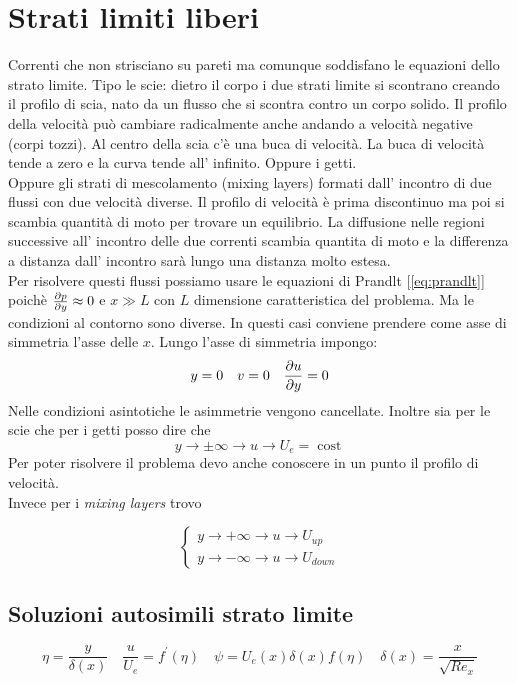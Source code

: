 \section{Strati limiti liberi}
Correnti che non strisciano su pareti ma comunque soddisfano le equazioni dello strato limite. Tipo le scie: dietro il corpo i due strati limite si scontrano creando il profilo di scia, nato da un flusso che si scontra contro un corpo solido. Il profilo della velocità può cambiare radicalmente anche andando a velocità negative (corpi tozzi). Al centro della scia c'è una buca di velocità. La buca di velocità tende a zero e la curva tende all' infinito.
Oppure i getti.\\
Oppure gli strati di mescolamento (mixing layers) formati dall' incontro di due flussi con due velocità diverse. Il profilo di velocità è prima discontinuo ma poi si scambia quantità di moto per trovare un equilibrio. La diffusione nelle regioni successive all' incontro delle due correnti scambia quantita di moto e la differenza a distanza dall' incontro sarà lungo una distanza molto estesa.\\
Per risolvere questi flussi possiamo usare le equazioni di Prandlt [\cref{eq:prandlt}] poichè $ \frac{\partial p}{\partial y}\approx  0 $ e $ x\gg L $ con $ L  $ dimensione caratteristica del problema.   
Ma le condizioni al contorno sono diverse.
In questi casi conviene prendere come asse di simmetria l'asse delle $ x $.
Lungo l'asse di simmetria impongo: 
\[
  y = 0\quad v = 0 \quad \frac{\partial u}{\partial y}=0
\]
Nelle condizioni asintotiche le asimmetrie vengono cancellate.
Inoltre sia per le scie che per i getti posso dire che
\[
  y\to \pm \infty \rightarrow u \to U_e = \operatorname{cost} 
\]
Per poter risolvere il problema devo anche conoscere in un punto il profilo di velocità.\\
Invece per i \emph{mixing layers} trovo

\begin{equation*}
  \begin{cases}
    y \to +\infty\rightarrow u\to U_{up}\\
    y \to -\infty\rightarrow u\to U_{down}
  \end{cases}
\end{equation*}
\subsection{Soluzioni autosimili strato limite}

\[
  \eta =\frac{y}{\delta \left( x\right) }\quad \frac{u}{U_e}=f^{\prime}\left( \eta \right) \quad \psi = U_e\left( x\right) \delta \left( x\right) f\left( \eta \right)  \quad \delta \left( x\right) =\frac{x}{\sqrt{Re_x}}
\]

